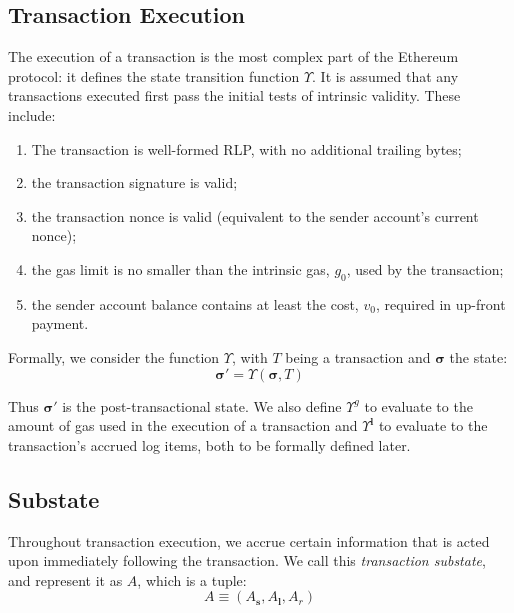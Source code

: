 \documentclass[9pt,oneside]{amsart}
\begin{document}
\begin{multicols}{2}

\section{Transaction Execution} \label{ch:transactions}

The execution of a transaction is the most complex part of the Ethereum protocol: it defines the state transition function $\Upsilon$. It is assumed that any transactions executed first pass the initial tests of intrinsic validity. These include:

\begin{enumerate}
\item The transaction is well-formed RLP, with no additional trailing bytes;
\item the transaction signature is valid;
\item the transaction nonce is valid (equivalent to the sender account's current nonce);
\item the gas limit is no smaller than the intrinsic gas, $g_0$, used by the transaction;
\item the sender account balance contains at least the cost, $v_0$, required in up-front payment.
\end{enumerate}

Formally, we consider the function $\Upsilon$, with $T$ being a transaction and $\boldsymbol{\sigma}$ the state:
\begin{equation}
\boldsymbol{\sigma}' = \Upsilon(\boldsymbol{\sigma}, T)
\end{equation}

Thus $\boldsymbol{\sigma}'$ is the post-transactional state. We also define $\Upsilon^g$ to evaluate to the amount of gas used in the execution of a transaction and $\Upsilon^\mathbf{l}$ to evaluate to the transaction's accrued log items, both to be formally defined later.

\subsection{Substate}
Throughout transaction execution, we accrue certain information that is acted upon immediately following the transaction. We call this \textit{transaction substate}, and represent it as $A$, which is a tuple:
\begin{equation}
A \equiv (A_\mathbf{s}, A_\mathbf{l}, A_r)
\end{equation}


\end{multicols}
\end{document}
